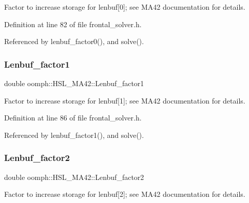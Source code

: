 Factor to increase storage for lenbuf\mbox{[}0\mbox{]}; see M\+A42 documentation for details. 



Definition at line 82 of file frontal\+\_\+solver.\+h.



Referenced by lenbuf\+\_\+factor0(), and solve().

\mbox{\label{classoomph_1_1HSL__MA42_a54b6950140ec309586c01d50dc1b86b6}} 
\subsubsection{\texorpdfstring{Lenbuf\+\_\+factor1}{Lenbuf\_factor1}}
{\footnotesize\ttfamily double oomph\+::\+H\+S\+L\+\_\+\+M\+A42\+::\+Lenbuf\+\_\+factor1\hspace{0.3cm}{\ttfamily [private]}}



Factor to increase storage for lenbuf\mbox{[}1\mbox{]}; see M\+A42 documentation for details. 



Definition at line 86 of file frontal\+\_\+solver.\+h.



Referenced by lenbuf\+\_\+factor1(), and solve().

\mbox{\label{classoomph_1_1HSL__MA42_a500112b3d3e08cae377a9775d0454ca9}} 
\subsubsection{\texorpdfstring{Lenbuf\+\_\+factor2}{Lenbuf\_factor2}}
{\footnotesize\ttfamily double oomph\+::\+H\+S\+L\+\_\+\+M\+A42\+::\+Lenbuf\+\_\+factor2\hspace{0.3cm}{\ttfamily [private]}}



Factor to increase storage for lenbuf\mbox{[}2\mbox{]}; see M\+A42 documentation for details. 



